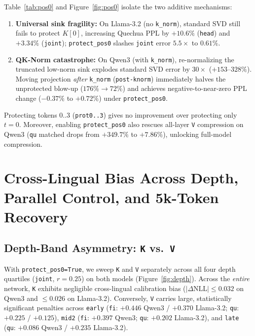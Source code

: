 \documentclass[11pt,a4paper,twocolumn]{article}
\begin{document}
Table~\ref{tab:pos0} and Figure~\ref{fig:pos0} isolate the two additive mechanisms:
\begin{enumerate}
  \item \textbf{Universal sink fragility:} On Llama-3.2 (no \texttt{k\_norm}), standard SVD still fails to protect $K[0]$, increasing Quechua PPL by $+10.6\%$ (\texttt{head}) and $+3.34\%$ (\texttt{joint}); \texttt{protect\_pos0} slashes \texttt{joint} error $5.5\times$ to $0.61\%$.
  \item \textbf{QK-Norm catastrophe:} On Qwen3 (with \texttt{k\_norm}), re-normalizing the truncated low-norm sink explodes standard SVD error by $30\times$ ($+153$--$328\%$). Moving projection \emph{after} \texttt{k\_norm} (\texttt{post-knorm}) immediately halves the unprotected blow-up ($176\%\rightarrow 72\%$) and achieves negative-to-near-zero PPL change ($-0.37\%$ to $+0.72\%$) under \texttt{protect\_pos0}.
\end{enumerate}
Protecting tokens $0..3$ (\texttt{prot0..3}) gives no improvement over protecting only $t=0$. Moreover, enabling \texttt{protect\_pos0} also rescues all-layer \texttt{V} compression on Qwen3 (\texttt{qu} matched drops from $+349.7\%$ to $+7.86\%$), unlocking full-model compression.

\section{Cross-Lingual Bias Across Depth, Parallel Control, and 5k-Token Recovery}
\label{sec:crosslingual}

\subsection{Depth-Band Asymmetry: \texttt{K} vs.\ \texttt{V}}
With \texttt{protect\_pos0=True}, we sweep \texttt{K} and \texttt{V} separately across all four depth quartiles (\texttt{joint}, $r=0.25$) on both models (Figure~\ref{fig:depth}). Across the \emph{entire} network, \texttt{K} exhibits negligible cross-lingual calibration bias ($|\Delta\text{NLL}|\le 0.032$ on Qwen3 and $\le 0.026$ on Llama-3.2). Conversely, \texttt{V} carries large, statistically significant penalties across \texttt{early} (\texttt{fi}: $+0.446$ Qwen3 / $+0.370$ Llama-3.2; \texttt{qu}: $+0.225$ / $+0.125$), \texttt{mid2} (\texttt{fi}: $+0.397$ Qwen3; \texttt{qu}: $+0.202$ Llama-3.2), and \texttt{late} (\texttt{qu}: $+0.086$ Qwen3 / $+0.235$ Llama-3.2).
\end{document}
